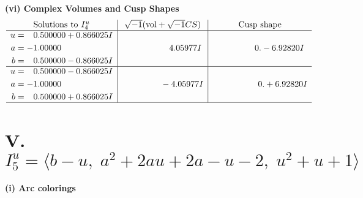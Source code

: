 \documentclass[1p]{elsarticle_modified}
\theoremstyle{definition}
\newcommand{\I}{\sqrt{-1}}
\begin{document}
\newpage\flushleft \textbf{(vi) Complex Volumes and Cusp Shapes}
$$\begin{array}{c|c|c}  
\text{Solutions to }I^u_{4}& \I (\text{vol} + \sqrt{-1}CS) & \text{Cusp shape}\\
 \hline 
\begin{aligned}
u &= \phantom{-}0.500000 + 0.866025 I \\
a &= -1.00000\phantom{ +0.000000I} \\
b &= \phantom{-}0.500000 - 0.866025 I\end{aligned}
 & \phantom{-0.000000 -}4.05977 I & \phantom{-0.000000 } 0. - 6.92820 I \\ \hline\begin{aligned}
u &= \phantom{-}0.500000 - 0.866025 I \\
a &= -1.00000\phantom{ +0.000000I} \\
b &= \phantom{-}0.500000 + 0.866025 I\end{aligned}
 & \phantom{-0.000000 } -4.05977 I & \phantom{-0.000000 -}0. + 6.92820 I\\
 \hline 
 \end{array}$$\newpage\newpage\renewcommand{\arraystretch}{1}
\centering \section*{V. $I^u_{5}= \langle b- u,\;a^2+2 a u+2 a- u-2,\;u^2+u+1 \rangle$}
\flushleft \textbf{(i) Arc colorings}\\
\end{document}

